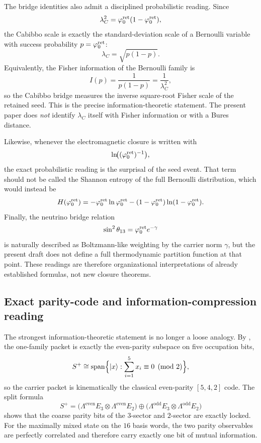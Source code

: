 The bridge identities also admit a disciplined probabilistic reading. Since
\[
\lambda_C^2=\varphi_0^{\mathrm{ret}}(1-\varphi_0^{\mathrm{ret}}),
\]
the Cabibbo scale is exactly the standard-deviation scale of a Bernoulli variable with success probability $p=\varphi_0^{\mathrm{ret}}$:
\[
\lambda_C=\sqrt{p(1-p)}.
\]
Equivalently, the Fisher information of the Bernoulli family is
\[
I(p)=\frac{1}{p(1-p)}=\frac{1}{\lambda_C^2},
\]
so the Cabibbo bridge measures the inverse square-root Fisher scale of the retained seed. This is the precise information-theoretic statement. The present paper does \emph{not} identify $\lambda_C$ itself with Fisher information or with a Bures distance.

Likewise, whenever the electromagnetic closure is written with
\[
\ln\!\bigl((\varphi_0^{\mathrm{ret}})^{-1}\bigr),
\]
the exact probabilistic reading is the surprisal of the seed event. That term should not be called the Shannon entropy of the full Bernoulli distribution, which would instead be
\[
H(\varphi_0^{\mathrm{ret}})
=
-\varphi_0^{\mathrm{ret}}\ln\varphi_0^{\mathrm{ret}}-(1-\varphi_0^{\mathrm{ret}})\ln(1-\varphi_0^{\mathrm{ret}}).
\]
Finally, the neutrino bridge relation
\[
\sin^2\theta_{13}=\varphi_0^{\mathrm{ret}} e^{-\gamma}
\]
is naturally described as Boltzmann-like weighting by the carrier norm $\gamma$, but the present draft does not define a full thermodynamic partition function at that point. These readings are therefore organizational interpretations of already established formulas, not new closure theorems.

\subsection{Exact parity-code and information-compression reading}

The strongest information-theoretic statement is no longer a loose analogy. By , the one-family packet is exactly the even-parity subspace on five occupation bits,
\[
S^+
\cong
\mathrm{span}\Bigl\{|x\rangle:\sum_{i=1}^5 x_i\equiv 0 \pmod 2\Bigr\},
\]
so the carrier packet is kinematically the classical even-parity $[5,4,2]$ code. The split formula
\[
S^+
=
\bigl(\Lambda^{\mathrm{even}}E_3\otimes\Lambda^{\mathrm{even}}E_2\bigr)
\oplus
\bigl(\Lambda^{\mathrm{odd}}E_3\otimes\Lambda^{\mathrm{odd}}E_2\bigr)
\]
shows that the coarse parity bits of the $3$-sector and $2$-sector are exactly locked. For the maximally mixed state on the $16$ basis words, the two parity observables are perfectly correlated and therefore carry exactly one bit of mutual information.

